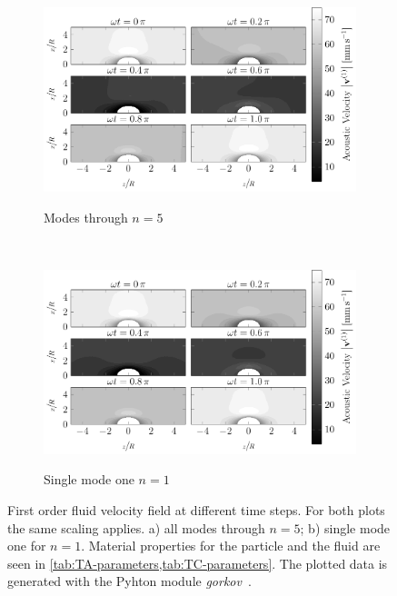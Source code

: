 \begin{figure}
  \centering
  \begin{subfigure}[b]{\textwidth}
    \centering
    \caption{Modes through $n=5$}
    \includegraphics[]{External/SC_all.pdf}
    \label{fig:TA-SC_all}
  \end{subfigure}\\%
  \begin{subfigure}[b]{\textwidth}
    \centering
    \caption{Single mode one $n=1$}
    \includegraphics[]{External/SC_mode1.pdf}
    \label{fig:TA-SC_mode1}
  \end{subfigure}
  \caption{First order fluid velocity field at different time steps. For both 
  plots the same scaling applies. a) all modes through $n=5$; b) single mode 
one for $n=1$. Material properties for the particle and the fluid are seen in 
\cref{tab:TA-parameters,tab:TC-parameters}. The plotted data is generated with 
the Pyhton module \emph{gorkov}~\cite{FankhauserPython2022}.}
  \label{fig:TA-SC}
\end{figure}

